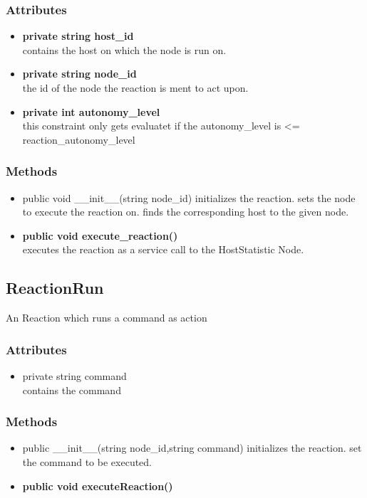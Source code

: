 \subsubsection{Attributes}
\begin{itemize}
	\item \textbf{ private string host\_id }\\
		contains the host on which the node is run on.
	\item \textbf{ private string node\_id }\\
		the id of the node the reaction is ment to act upon.
	\item \textbf{ private int autonomy\_level }\\
		this constraint only gets evaluatet if 
		the autonomy\_level is <= reaction\_autonomy\_level
\end{itemize}
\subsubsection{Methods}
\begin{itemize}
	\item public void \_\_init\_\_(string node\_id)
		initializes the reaction. sets the node to execute the reaction on. finds the corresponding host to the given node.
	\item \textbf{ public void execute\_reaction() }\\
		executes the reaction as a service call to the HostStatistic Node.
\end{itemize}


\subsection{ReactionRun}
	An Reaction which runs a command as action 
\subsubsection{Attributes}
\begin{itemize}
	\item private string command
	\\ contains the command
\end{itemize}
\subsubsection{Methods}
\begin{itemize}
	\item public \_\_init\_\_(string node\_id,string command)
		initializes the reaction. set the command to be executed.
	\item \textbf{ public void executeReaction() }\\
\end{itemize}



